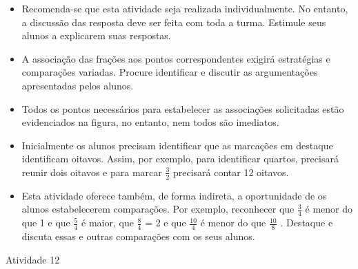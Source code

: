 \documentclass[oneside]{book}
\begin{document}
\begin{multicols}{2}
\begin{itemize}  
     \item  Recomenda-se que esta atividade seja realizada individualmente. No entanto, a discussão das resposta deve ser feita com toda a turma. Estimule seus alunos a explicarem suas respostas.  
     \item  A associação das frações aos pontos correspondentes exigirá estratégias e comparações variadas. Procure identificar e discutir as argumentações apresentadas pelos alunos.   
     \item  Todos os pontos necessários para estabelecer as associações solicitadas estão evidenciados na figura, no entanto, nem todos são imediatos.  
     \item  Inicialmente os alunos precisam identificar que as marcações em destaque identificam oitavos. Assim, por exemplo, para identificar quartos, precisará reunir dois oitavos e para marcar   $\frac{3}{2}$   precisará contar 12 oitavos.  
     \item  Esta atividade oferece também, de forma indireta, a oportunidade de os alunos estabelecerem comparações. Por exemplo, reconhecer que   $\frac{3}{4}$   é menor do que 1 e que   $\frac{5}{4}$   é maior, que   $\frac{8}{4}$   = 2 e que   $\frac{10}{4}$   é menor do que   $\frac{10}{8}$  . Destaque e discuta essas e outras comparações com os seus alunos.   
\end{itemize}      
 
\begin{resposta*}{Atividade 12}
\noindent
{}
\end{resposta*}
\end{multicols}
\end{document}
